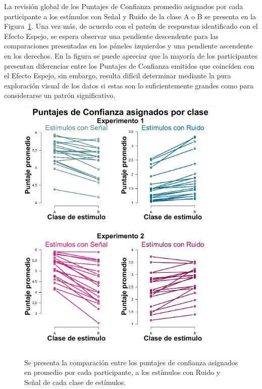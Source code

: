 La revisión global de los Puntajes de Confianza promedio asignados por cada participante a los estímulos con Señal y Ruido de la clase A o B se presenta en la Figura~\ref{fig:Diff_Ratings}. Una vez más, de acuerdo con el patrón de respuestas identificado con el Efecto Espejo, se espera observar una pendiente descendente para las comparaciones presentadas en los páneles izquierdos y una pendiente ascendente en los derechos. En la figura se puede apreciar que la mayoría de los participantes presentan diferencias entre los Puntajes de Confianza emitidos que coincíden con el Efecto Espejo, sin embargo, resulta difícil determinar mediante la pura exploración visual de los datos si estas son lo suficientemente grandes como para considerarse un patrón significativo.\\

\begin{figure}[p]
\centering
\includegraphics[width=0.9\textwidth]{Figures/Diff_Rating_E1}\\ 
\includegraphics[width=0.9\textwidth]{Figures/Diff_Rating_E2}\\
\decoRule
\caption[Comparación entre los Puntajes de Confianza asignados a los ensayos con Ruido y Señal de cada clase]{Se presenta la comparación entre los puntajes de confianza asignados en promedio por cada participante, a los estímulos con Ruido y Señal de cada clase de estímulos.}
\label{fig:Diff_Ratings}
\end{figure}

